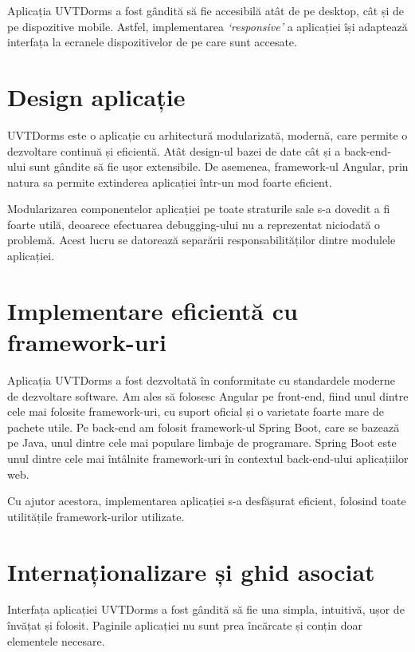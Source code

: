 \documentclass[12pt,a4paper]{report}
\theoremstyle{definition}
\theoremstyle{remark}
\begin{document}
\par Aplicația UVTDorms a fost gândită să fie accesibilă atât de pe desktop, cât și de pe dispozitive mobile. Astfel, implementarea \textit{`responsive'} a aplicației își adaptează interfața la ecranele dispozitivelor de pe care sunt accesate. 

\section{Design aplicație}

\par UVTDorms este o aplicație cu arhitectură modularizată, modernă, care permite o dezvoltare continuă și eficientă. Atât design-ul bazei de date cât și a back-end-ului sunt gândite să fie ușor extensibile. De asemenea, framework-ul Angular, prin natura sa permite extinderea aplicației într-un mod foarte eficient.

\par Modularizarea componentelor aplicației pe toate straturile sale s-a dovedit a fi foarte utilă, deoarece efectuarea debugging-ului nu a reprezentat niciodată o problemă. Acest lucru se datorează separării responsabilităților dintre modulele aplicației.

\section{Implementare eficientă cu framework-uri}

\par Aplicația UVTDorms a fost dezvoltată în conformitate cu standardele moderne de dezvoltare software. Am ales să folosesc Angular pe front-end, fiind unul dintre cele mai folosite framework-uri, cu suport oficial și o varietate foarte mare de pachete utile. Pe back-end am folosit framework-ul Spring Boot, care se bazează pe Java, unul dintre cele mai populare limbaje de programare. Spring Boot este unul dintre cele mai întâlnite framework-uri în contextul back-end-ului aplicațiilor web.

\par Cu ajutor acestora, implementarea aplicației s-a desfășurat eficient, folosind toate utilitățile framework-urilor utilizate.

\section{Internaționalizare și ghid asociat}

\par Interfața aplicației UVTDorms a fost gândită să fie una simpla, intuitivă, ușor de învățat și folosit. Paginile aplicației nu sunt prea încărcate și conțin doar elementele necesare.
\end{document}
